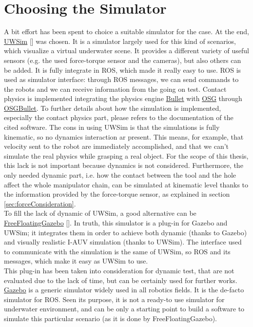 \section{Choosing the Simulator}
\label{sec:simulators}
A bit effort has been spent to choice a suitable simulator for the case. At the end, \href{http://www.irs.uji.es/uwsim/}{UWSim} [\cite{uwsim}] was chosen. It is a simulator largely used for this kind of scenarios, which visualize a virtual underwater scene. It provides a different variety of useful sensors (e.g. the used force-torque sensor and the cameras), but also others can be added. It is fully integrate in ROS, which made it really easy to use. ROS is used as simulator interface: through ROS messages, we can send commands to the robots and we can receive information from the going on test. Contact physics is implemented integrating the physics engine \href{https://pybullet.org/wordpress/}{Bullet} with \href{http://www.openscenegraph.org/}{OSG} through \href{https://github.com/mccdo/osgbullet}{OSGBullet}. To further details about how the simulation is implemented, especially the contact physics part, please refers to the documentation of the cited software. The cons in using UWSim is that the simulations is fully kinematic, so no dynamics interaction ar present. This means, for example, that velocity sent to the robot are immediately accomplished, and that we can't simulate the real physics while grasping a real object. For the scope of this thesis, this lack is not important because dynamics is not considered. Furthermore, the only needed dynamic part, i.e. how the contact between the tool and the hole affect the whole manipulator chain, can be simulated at kinematic level thanks to the information provided by the force-torque sensor, as explained in section \ref{sec:forceConsideration}.\\
To fill the lack of dynamic of UWSim, a good alternative can be \href{https://github.com/freefloating-gazebo/freefloating_gazebo}{FreeFloatingGazebo} [\cite{freeFloatingGazebo}]. In truth, this simulator is a plug-in for Gazebo and UWSim; it integrates them in order to achieve both dynamic (thanks to Gazebo) and visually realistic I-AUV simulation (thanks to UWSim). The interface used to communicate with the simulation is the same of UWSim, so ROS and its messages, which make it easy as UWSim to use. \\
This plug-in has been taken into consideration for dynamic test, that are not evaluated due to the lack of time, but can be certainly used for further works.
\href{http://gazebosim.org/}{Gazebo} is a generic simulator widely used in all robotics fields. It is the de-facto simulator for ROS. Seen its purpose, it is not a ready-to use simulator for underwater environment, and can be only a starting point to build a software to simulate this particular scenario (as it is done by FreeFloatingGazebo).\\
